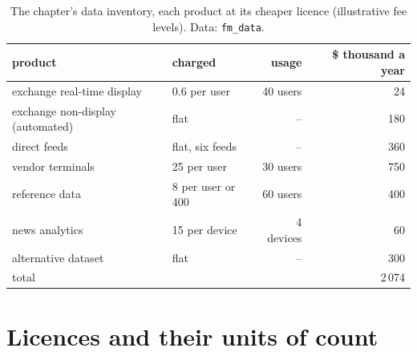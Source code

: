 \begin{table}[ht]
\centering\small\setlength{\tabcolsep}{4pt}
\begin{tabular}{llrr}
\toprule
product & charged & usage & \$ thousand a year \\
\midrule
exchange real-time display & 0.6 per user & 40 users & 24 \\
exchange non-display (automated) & flat & -- & 180 \\
direct feeds & flat, six feeds & -- & 360 \\
vendor terminals & 25 per user & 30 users & 750 \\
reference data & 8 per user or 400 & 60 users & 400 \\
news analytics & 15 per device & 4 devices & 60 \\
alternative dataset & flat & -- & 300 \\
\midrule
total & & & 2\,074 \\
\bottomrule
\end{tabular}
\caption{The chapter's data inventory, each product at its cheaper licence (illustrative fee levels). Data: \texttt{fm\_data}.}\label{tab:fm:data-strategy-and-costs:inventory}
\end{table}

\begin{omfigure}

\label{fig:fm:data-strategy-and-costs:budget}
\end{omfigure}

\section{Licences and their units of count}

